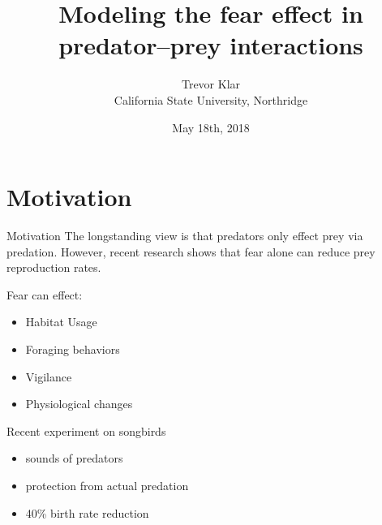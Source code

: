\documentclass{beamer}
\title{Modeling the fear effect in predator–prey interactions}
\author{Trevor Klar\\ California State University, Northridge}
\date{May 18th, 2018}
\begin{document}
\begin{frame}
    \titlepage
\end{frame}
\section{Motivation}
\begin{frame}{Motivation}
The longstanding view is that predators only effect prey via predation. However, recent research shows that fear alone can reduce prey reproduction rates.

\mbox{}

Fear can effect:
\begin{itemize}
\item Habitat Usage
\item Foraging behaviors
\item Vigilance
\item Physiological changes
\end{itemize}
\end{frame}

\begin{frame}
Recent experiment on songbirds
\begin{itemize}
\item sounds of predators
\item protection from actual predation
\item 40\% birth rate reduction
\end{itemize}
\end{frame}
\end{document}
